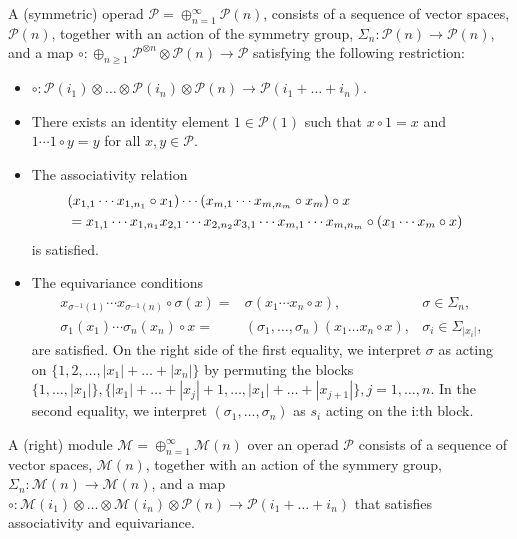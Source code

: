 \documentclass[10pt,a4paper]{article}
\begin{document}
A (symmetric) operad $\mathcal{P}=\oplus_{n=1}^{\infty}\mathcal{P}(n)$, consists of a sequence of vector spaces, $\mathcal{P}(n)$, together with an action of the symmetry group, $\Sigma_n : \mathcal{P}(n) \to \mathcal{P}(n)$, and a map $\circ : \oplus_{n \geq 1} \mathcal{P}^{\otimes n} \otimes \mathcal{P}(n) \to \mathcal{P}$ satisfying the following restriction:
\begin{itemize}
\item $\circ : \mathcal{P}(i_1) \otimes \dots \otimes \mathcal{P}(i_n) \otimes \mathcal{P}(n)  \to \mathcal{P}(i_1 + \dots + i_n)$.
\item There exists an identity element $1 \in \mathcal{P}(1)$ such that $x \circ 1 =x$ and $1 \cdots 1 \circ y = y$ for all $x,y \in \mathcal{P}$.
\item The associativity relation
\begin{align*}
\lefteqn{(x_{1,1}  \cdots  x_{1,n_1} \circ x_1) \cdots (x_{m,1} \cdots x_{m,n_m} \circ x_m) \circ x}\\
&= x_{1,1} \cdots x_{1,n_1} x_{2,1} \cdots x_{2,n_2} x_{3,1} \cdots x_{m,1} \cdots  x_{m,n_m} \circ (x_1 \cdots x_m \circ x)
\end{align*}
is satisfied.
\item The equivariance conditions
\begin{align*}
x_{\sigma^{-1}(1)} \cdots x_{\sigma^{-1}(n)} \circ \sigma(x)
=&\sigma(x_1 \cdots x_n \circ x), & \sigma \in \Sigma_n, \\
\sigma_1(x_1) \cdots  \sigma_n(x_n) \circ x =& (\sigma_1,\ldots,\sigma_n)(x_1  \ldots x_n \circ x), & \sigma_i \in \Sigma_{|x_i|},
\end{align*}
are satisfied. On the right side of the first equality, we interpret $\sigma$ as acting on $\{1,2,\dots,|x_1|+\dots+|x_n| \}$ by permuting the blocks $\{1,\dots,|x_1|\}, \{|x_1|+\dots+|x_j|+1,\dots,|x_1|+\dots+|x_{j+1}|\}, j=1,\dots,n$. In the second equality, we interpret $(\sigma_1,\ldots,\sigma_n)$ as $s_i$ acting on the i:th block.
\end{itemize}

A (right) module\cite{Fresse2007} $\mathcal{M}=\oplus_{n=1}^{\infty}\mathcal{M}(n)$ over an operad $\mathcal{P}$ consists of a sequence of vector spaces, $\mathcal{M}(n)$, together with an action of the symmery group, $\Sigma_n : \mathcal{M}(n) \to \mathcal{M}(n)$, and a map $\circ:  \mathcal{M}(i_1)\otimes\dots \otimes \mathcal{M}(i_n) \otimes \mathcal{P}(n) \to \mathcal{P}(i_1 + \dots + i_n)$ that satisfies associativity and equivariance.\\ 
\end{document}
